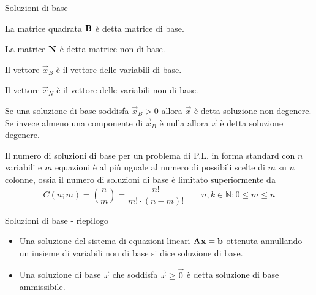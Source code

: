 \documentclass{beamer}
\begin{document}
\begin{frame}[allowframebreaks]{Soluzioni di base}
\begin{definition}
     La matrice quadrata $\mathbf{B} $ \`e detta matrice di base.
 \end{definition}

\begin{definition}
    La matrice $\mathbf{N}$ \`e detta matrice non di base.
 \end{definition}

\begin{definition}
   Il vettore $\vec{x}_B$ \`e il vettore delle variabili di base.
\end{definition}
\framebreak
\begin{definition}
    Il vettore $\vec{x}_N$ \`e il vettore delle variabili non di base.
\end{definition}
 
 \begin{definition}
    Se una soluzione di base soddisfa $\vec{x}_B > 0$ allora $\vec{x}$ \`e detta soluzione non degenere. Se invece almeno una componente di $\vec{x}_B$ \`e nulla allora $\vec{x}$ \`e detta soluzione degenere. 
   \end{definition}
  
{\small 
    Il numero di soluzioni di base per un problema di P.L. in forma standard con $n$ variabili e
   $m$ equazioni \`e al pi\`u uguale al numero di possibili scelte di $m$ su $n$ colonne, ossia il numero di
  soluzioni di base \`e limitato superiormente da
  \[ C(n ; m) = {n \choose m} = \frac{n!}{m! \cdot \left( n - m \right) !}\qquad n,k\in\mathbb{N}; 0\leq m \leq n \]
}

  
\framebreak

  \begin{block}{Soluzioni di base - riepilogo}
  \begin{itemize}
  \item Una soluzione del sistema di equazioni lineari $\mathbf{A}\mathbf{x}  = \mathbf{b}$ ottenuta annullando un insieme di variabili non di base si dice soluzione di base.
  
   \item Una soluzione di base $\vec{x}$ che soddisfa $\vec{x} \geq \vec{0}$ \` e detta soluzione di base ammissibile.
  

\end{itemize}
\end{block}
\end{frame}
\end{document}
